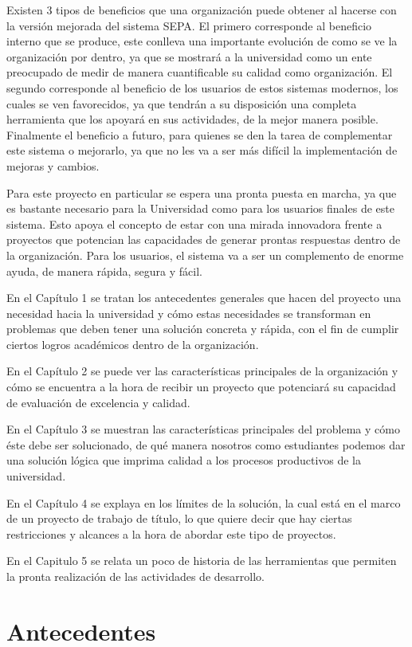 \documentclass[a4paper,12pt,openany,oneside]{book}
\begin{document}
Existen 3 tipos de beneficios que una organización puede obtener al hacerse con la versión mejorada del sistema SEPA. El primero corresponde al beneficio interno que se produce, este conlleva una importante evolución de como se ve la organización por dentro, ya que se mostrará a la universidad como un ente preocupado de medir de manera cuantificable su calidad como organización. El segundo corresponde al beneficio de los usuarios de estos sistemas modernos, los cuales se ven favorecidos, ya que tendrán a su disposición una completa herramienta que los apoyará en sus actividades, de la mejor manera posible. Finalmente el beneficio a futuro, para quienes se den la tarea de complementar este sistema o mejorarlo, ya que no les va a ser más difícil la implementación de mejoras y cambios.

Para este proyecto en particular se espera una pronta puesta en marcha, ya que es bastante necesario para la Universidad como para los usuarios finales de este sistema. Esto apoya el concepto de estar con una mirada innovadora frente a proyectos que potencian las capacidades de generar prontas respuestas dentro de la organización. Para los usuarios, el sistema va a ser un complemento de enorme ayuda, de manera rápida, segura y fácil.

En el Capítulo 1 se tratan los antecedentes generales que hacen del proyecto una necesidad hacia la universidad y cómo estas necesidades se transforman en problemas que deben tener una solución concreta y rápida, con el fin de cumplir ciertos logros académicos dentro de la organización.

En el Capítulo 2 se puede ver las características principales de la organización y cómo se encuentra a la hora de recibir un proyecto que potenciará su capacidad de evaluación de excelencia y calidad.

En el Capítulo 3 se muestran las características principales del problema y cómo éste debe ser solucionado, de qué manera nosotros como estudiantes podemos dar una solución lógica que imprima calidad a los procesos productivos de la universidad.

En el Capítulo 4 se explaya en los límites de la solución, la cual está en el marco de un proyecto de trabajo de título, lo que quiere decir que hay ciertas restricciones y alcances a la hora de abordar este tipo de proyectos.

En el Capitulo 5 se relata un poco de historia de las herramientas que permiten la pronta realización de las actividades de desarrollo.
\chapter{Antecedentes}
\thispagestyle{empty}
\end{document}
